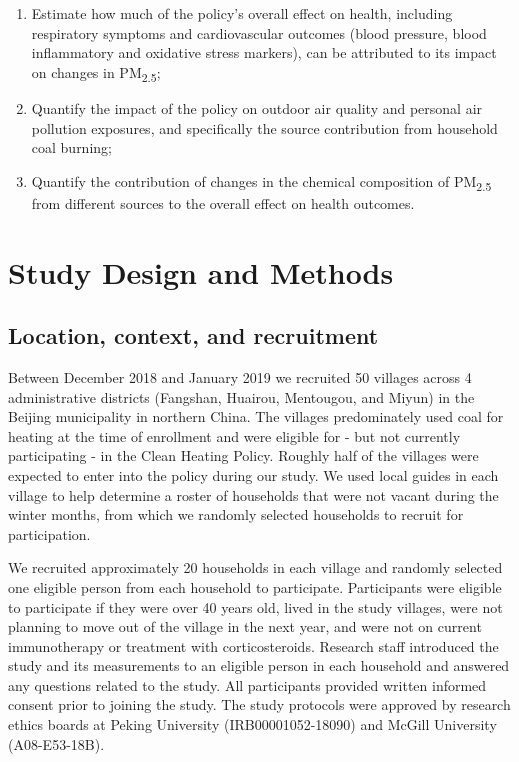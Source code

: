 \documentclass[
  letterpaper,
  DIV=11,
  numbers=noendperiod]{scrartcl}
\begin{document}
\begin{enumerate}
\def\labelenumi{\arabic{enumi}.}
\item
  Estimate how much of the policy's overall effect on health, including
  respiratory symptoms and cardiovascular outcomes (blood pressure,
  blood inflammatory and oxidative stress markers), can be attributed to
  its impact on changes in PM\textsubscript{2.5};
\item
  Quantify the impact of the policy on outdoor air quality and personal
  air pollution exposures, and specifically the source contribution from
  household coal burning;
\item
  Quantify the contribution of changes in the chemical composition of
  PM\textsubscript{2.5} from different sources to the overall effect on
  health outcomes.
\end{enumerate}

\hypertarget{study-design-and-methods}{%
\section{Study Design and Methods}\label{study-design-and-methods}}

\hypertarget{location-context-and-recruitment}{%
\subsection{Location, context, and
recruitment}\label{location-context-and-recruitment}}

Between December 2018 and January 2019 we recruited 50 villages across 4
administrative districts (Fangshan, Huairou, Mentougou, and Miyun) in
the Beijing municipality in northern China. The villages predominately
used coal for heating at the time of enrollment and were eligible for -
but not currently participating - in the Clean Heating Policy. Roughly
half of the villages were expected to enter into the policy during our
study. We used local guides in each village to help determine a roster
of households that were not vacant during the winter months, from which
we randomly selected households to recruit for participation.

We recruited approximately 20 households in each village and randomly
selected one eligible person from each household to participate.
Participants were eligible to participate if they were over 40 years
old, lived in the study villages, were not planning to move out of the
village in the next year, and were not on current immunotherapy or
treatment with corticosteroids. Research staff introduced the study and
its measurements to an eligible person in each household and answered
any questions related to the study. All participants provided written
informed consent prior to joining the study. The study protocols were
approved by research ethics boards at Peking University
(IRB00001052-18090) and McGill University (A08-E53-18B).
\end{document}
